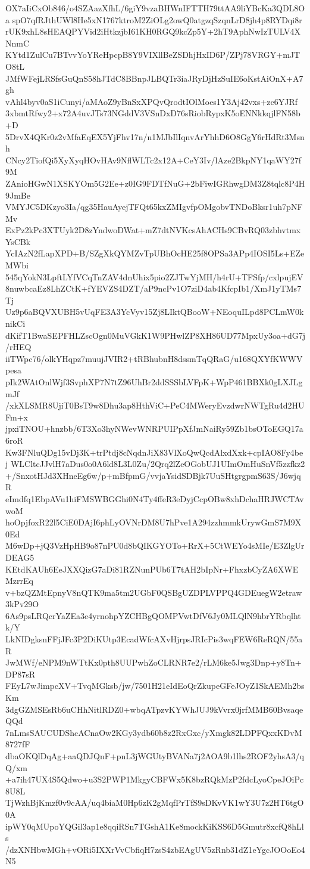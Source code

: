 OX7aIiCxOb846/o4SZAazXfhL/6giY9vzaBHWnIFTTH79ttAA9liYBcKa3QDL8Oa
spO7qfRJthUWl8He5xN1767ktroM2ZiOLg2owQ0atgzqSzqnLrD8jh4p8RYDqi8r
rUK9xhL8sHEAQPYVid2iHtkzjbI61KH0RGQ9kcZp5Y+2hT9AphNwIzTULV4XNnmC
KYtd1ZulCu7BTvvYoYReHpcpB8Y9VIXllBeZSDhjHxID6P/ZPj78VRGY+mJTO8tL
JMfWFejLRSfsGuQnS58hJTdC8BBnpJLBQTr3iaJRyDjHzSuIE6oKstAiOnX+A7gh
vAhl4byv0aS1iCunyi/aMAoZ9yBnSxXPQvQrodtIOlMoes1Y3Aj42vxs+zc6YJRf
3xbmtRfwy2+x72A4uvJTs73NGddV3VSnDxD76sRiobRypxK5oENNkkqjlFN58b+D
5DrvX4QKr0z2vMfaEqEX5YjFhv17n/n1MJbIlIqnvArYhhD6O8GgY6rHdRt3Msnh
CNcy2TiofQi5XyXyqHOvHAv9NflWLTc2x12A+CeY3Iv/lAze2BkpNY1qaWY27f9M
ZAnioHGwN1XSKYOm5G2Ee+z0IG9FDTfNuG+2bFiwIGRhwgDM3Z8tqlc8P4H9JmBe
VMYJC5DKzyo3Ia/qg35HauAyejTFQt65kxZMIgvfpOMgobvTNDoBksr1uh7pNFMv
ExPz2kPc3XTUyk2D8zYndwoDWat+mZ7dtNVKcsAhACHs9CBvRQ03zbhvtmxYsCBk
YcIAzN2fLapXPD+B/SZgXkQYMZvTpUBhOcHE25f8OPSa3APp4IOSI5Ls+EZeMWbi
545qYokN3LpftLYfVCqTnZAV4dnUhix5pio2ZJTwYjMH/h4rU+TFSfp/cxlpujEV
8nuwbcaEz8LhZCtK+fYEVZS4DZT/aP9ncPv1O7ziD4ab4KfcpIb1/XmJ1yTMs7Tj
Uz9p6aBQVXUBH5vUqFE3A3YcVyv15Zj8LIktQBooW+NEoquILpd8PCLmW0knikCi
dKifT1BwaSEPFHLZscOgn0MuVGkK1W9PHwlZP8XH86UD77MpxUy3oa+dG7j/rHEQ
iiTWpc76/olkYHqpz7muujJVIR2+tRBhubnH8dssmTqQRaG/u168QXYfKWWVpesa
pIk2WAtOnlWjf3SvphXP7N7tZ96UhBr2ddSSSbLVFpK+WpP461BBXk0gLXJLgmJf
/xkXLSMR8UjiT0BsT9w8Dhu3ap8HthViC+PeC4MWeryEvzdwrNWTgRu4d2HUFm+x
jpxiTNOU+hnzbb/6T3Xo3hyNWevWNRPUIPpXfJmNaiRy59Zb1bsOToEGQ17a6roR
Kw3FNluQDg15vDj3K+trPtdj8cNqdnJiX83VlXoQwQcdAlxdXxk+cpIAO8Fy4bej
WLCltcJJvlH7aDus0o0A6ld8L3L0Zu/2Qrq2lZeOGobUJ1UImOmHuSnVf5zzfkz2
+/SnxotHJd3XHneEg6w/p+mBfpmG/vvjaYsidSDBjk7UuSHtgrgpmS63S/J6wjqR
eImdfq1EbpAVu1hiFMSWBGGhi0N4Ty4ffeR3eDyjCcpOBw8xhDchaHRJWCTAvwoM
hoOpjfoxR22l5CiE0DAjI6phLyOVNrDM8U7hPve1A294zzhmmkUrywGmS7M9X0Ed
M6wDp+jQ3VzHpHB9o87nPU0d8bQIKGYOTo+RrX+5CtWEYo4sMIe/E3ZlgUrDEAG5
KEtdKAUh6EeJXXQizG7aDi81RZNunPUb6T7tAH2bIpNr+FhxzbCyZA6XWEMzrrEq
v+bzQZMtEpnyV8nQTK9ma5tm2UGbF0QSBgUZDPLVPPQ4GDEuegW2etraw3kPv29O
6As9psLRQcrYaZEa3e4yrnohpYZCHBgQOMPVwtDfV6Jy0MLQlN9hbrYRbqlhtk/Y
LkNIDgksnFFjJFc3P2DiKUtp3EcadWfcAXvHjrpsJRIcPis3wqFEW6ReRQN/55aR
JwMWf/eNPM9nWTtKx0pth8UUPwhZoCLRNR7e2/rLM6ke5Jwg3Dnp+y8Tn+DP87sR
FEyL7wJimpcXV+TvqMGksb/jw/7501H21eIdEoQrZkupeGFeJOyZ1SkAEMh2bsKm
3dgGZMSEsRb6uCHhNitlRDZ0+wbqATpzvKYWhJUJ9kVvrx0jrfMMB60BvsaqeQQd
7nLmsSAUCUDShcACnaOw2KGy3ydb60b8z2RxGxc/yXmgk82LDPFQxxKDvM8727fF
dbaOKQlDqAg+aaQDJQnF+pnL3jWGUtyBVANa7j2AOA9b1lhs2ROF2yhsA3/qQ/xm
+a7ih47UX4S5Qdwo+u3S2PWP1MkgyCBFWx5K8bzRQkMzP2fdcLyoCpeJOiPc8U8L
TjWzhBjKmzf0v9cAA/uq4biaM0Hp6zK2gMqfPrTfS9sDKvVK1wY3U7z2HT6tgO0A
ipWY0qMUpoYQGil3ap1e8qqiRSn7TGshA1Ke8mockKiKSS6D5Gmutr8xcfQ8hLls
/dzXNHbwMGh+vORi5IXXrVvCbfiqH7zsS4zbEAgUV5zRnb31dZ1eYgcJOOoEo4N5
